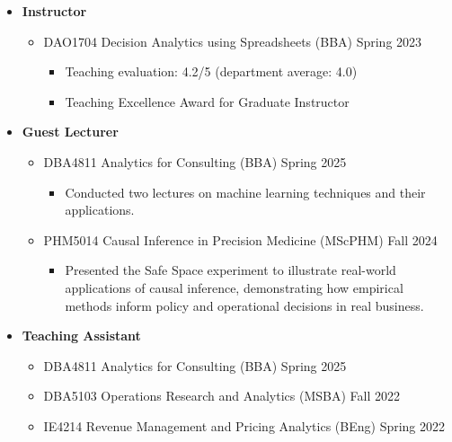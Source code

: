 \documentclass[12pt, a4paper]{article}
\begin{document}
{\begin{itemize}
	\item[] \textbf{Instructor}
	\begin{itemize}
		\item DAO1704 Decision Analytics using Spreadsheets (BBA) \hfill Spring 2023
		\begin{itemize}
			\item {\footnotesize Teaching evaluation: 4.2/5 (department average: 4.0)}
			\item {\footnotesize Teaching Excellence Award for Graduate Instructor}
		\end{itemize}
	\end{itemize}

	\item[] \textbf{Guest Lecturer}
	\begin{itemize}
		\item DBA4811 Analytics for Consulting (BBA) \hfill Spring 2025
		\begin{itemize}
			\item {\footnotesize Conducted two lectures on machine learning techniques and their applications.}
		\end{itemize}
		\item PHM5014 Causal Inference in Precision Medicine (MScPHM) \hfill Fall 2024
		\begin{itemize}
			\item {\footnotesize Presented the Safe Space experiment to illustrate real-world applications of causal inference, demonstrating how empirical methods inform policy and operational decisions in real business.}
		\end{itemize}
	\end{itemize}

	\item[] \textbf{Teaching Assistant}
	\begin{itemize}
		\item DBA4811 Analytics for Consulting (BBA) \hfill Spring 2025
		\item DBA5103 Operations Research and Analytics (MSBA) \hfill Fall 2022
		\item IE4214 Revenue Management and Pricing Analytics (BEng) \hfill Spring 2022
	\end{itemize}
\end{itemize}


}
\end{document}
